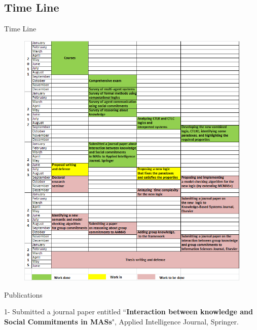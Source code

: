 \documentclass{beamer}
\begin{document}
\subsection{Time Line}
    \begin{frame}{Time Line}


\begin{figure}[htbp]
\begin{center}
\includegraphics[width=.65 \columnwidth]{figures/figure6.png}
\end{center}
\end{figure}
    \end{frame}
\begin{frame}{Publications}

1- Submitted a journal paper entitled ``\textbf{Interaction between knowledge and Social Commitments in MASs}", Applied Intelligence Journal, Springer.\\


\end{frame}
\end{document}
